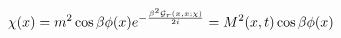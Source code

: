 \begin{equation}
\chi(x) = m^2 \cos \beta \phi(x) e^{-\frac{\beta^2 {\cal G}_r(x,x;\chi)}{2i}} = M^2
(x,t) \cos \beta \phi(x) \end{equation}


